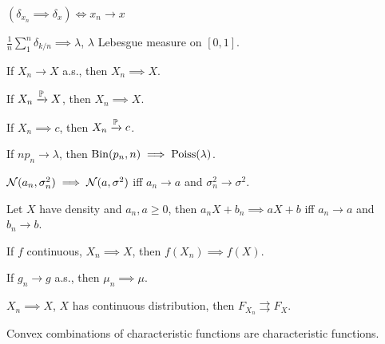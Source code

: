 



	\begin{proposition}[1.1]
		$(\delta_{x_n} \implies \delta_x) \iff x_n \to x$
	\end{proposition}
	
	\begin{proposition}[1.2]
		$\frac{1}{n} \sum_1^n \delta_{k/n} \implies \lambda$,
		$\lambda$ Lebesgue measure on $[0,1]$.
	\end{proposition}
	
	\begin{proposition}[1.3]
		If $X_n \to X$ a.s., then $X_n \implies X$.
		
		If $X_n \xrightarrow{\P} X$, then $X_n \implies X$.
		
		If $X_n \implies c$, then $X_n \xrightarrow{\P} c$.
	\end{proposition}
	
	\begin{proposition}[1.7]
		If $n p_n \to \lambda$, 
		then $\mr{Bin}(p_n, n) \implies \mr{Poiss}(\lambda)$.
	\end{proposition}
	
	\begin{proposition}[1.12]
		$\N(a_n, \sigma_n^2) \implies \N(a, \sigma^2)$ 
		iff $a_n \to a$ and $\sigma_n^2 \to \sigma^2$.
	\end{proposition}
	
	\begin{proposition}[2.1]
		Let $X$ have density and $a_n, a \geq 0$, 
		then $a_n X + b_n \implies aX+b$ iff $a_n \to a$ and $b_n \to b$.
	\end{proposition}
	
	\begin{proposition}[2.2]
		If $f$ continuous, $X_n \implies X$, then $f(X_n) \implies f(X)$.
	\end{proposition}
	
	\begin{theorem}
		If $g_n \to g$ a.s., then $\mu_n \implies \mu$.
	\end{theorem}
	
	\begin{proposition}[2.7]
		$X_n \implies X$, $X$ has continuous distribution, 
		then $F_{X_n} \rightrightarrows F_X$.
	\end{proposition}
	
	\begin{proposition}[3.4]
		Convex combinations of characteristic functions 
		are characteristic functions.
	\end{proposition}
	
